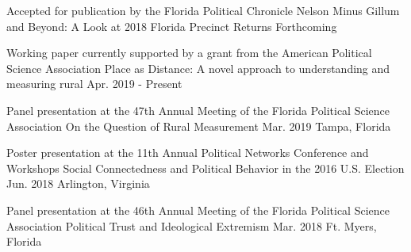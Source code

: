 

\begin{cventries}


\cventry
  {Accepted for publication by the Florida Political Chronicle} %
  {Nelson Minus Gillum and Beyond: A Look at 2018 Florida Precinct Returns} %
  {Forthcoming} %
  {} %
  {}

\vspace{-.25cm}
\cventry
  {Working paper currently supported by a grant from the American Political Science Association} %
  {Place as Distance: A novel approach to understanding and measuring rural} %
  {Apr. 2019 - Present} %
  {} %
  {}

\vspace{-.25cm}
\cventry
  {Panel presentation at the 47th Annual Meeting of the Florida Political Science Association} %
  {On the Question of Rural Measurement} %
  {Mar. 2019} %
  {Tampa, Florida} %
  {}

\vspace{-.25cm}
\cventry
  {Poster presentation at the 11th Annual Political Networks Conference and Workshops} %
  {Social Connectedness and Political Behavior in the 2016 U.S. Election} %
  {Jun. 2018} %
  {Arlington, Virginia} %
  {}

\vspace{-.25cm}
\cventry
  {Panel presentation at the 46th Annual Meeting of the Florida Political Science Association} %
  {Political Trust and Ideological Extremism} %
  {Mar. 2018} %
  {Ft. Myers, Florida} %
  {}

\vspace{-.25cm}


\end{cventries}

